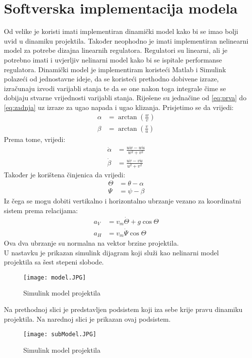 \section{Softverska implementacija modela}
Od velike je koristi imati implementiran dinamički model kako bi se imao bolji 
uvid u dinamiku projektila. Također neophodno je imati implementiran 
nelinearni model za potrebe dizajna linearnih regulatora. Regulatori su linearni, ali 
je potrebno imati i uvjerljiv nelinarni model kako bi se ispitale performanse regulatora.
Dinamički model je implementiram koristeći Matlab i Simulink polazeći od jednostavne ideje,
da se koristeći prethodno dobivene izraze, izračunaju izvodi varijabli stanja te da se one 
nakon toga integrale čime se dobijaju stvarne vrijednosti varijabli stanja. Riješene su jednačine 
od \ref{eq:prva} do \ref{eq:zadnja} uz izraze za ugao napada i ugao klizanja. 
Prisjetimo se da vrijedi:
\begin{align*}
    \alpha &= \arctan(\frac{w}{v})\\
    \beta &= \arctan(\frac{v}{u})
\end{align*}
Prema tome, vrijedi:
\begin{align}
    \dot{\alpha} &= \frac{u\dot{w} - w\dot{u}}{w^2+v^2}\\
    \dot{\beta} &= \frac{u\dot{v} - v\dot{u}}{u^2+v^2}
\end{align}
Također je korištena činjenica da vrijedi:
\begin{align}
    \Theta &= \theta - \alpha\\
     \Psi &= \psi - \beta
\end{align}
Iz čega se mogu dobiti vertikalno i horizontalno ubrzanje vezano za koordinatni sistem prema relacijama:
\begin{align}
    a_V &= v_m\dot{\Theta} + g\cos\Theta \\
    a_H &= v_m\dot{\Psi}\cos\Theta 
\end{align}
Ova dva ubrzanje su normalna na vektor brzine projektila. \\
U nastavku je prikazan simulink dijagram koji služi kao nelinarni model projektila sa 
šest stepeni slobode. 
\begin{figure}[!ht]
    \centering
    \texttt{[image: model.JPG]}
    \caption{Simulink model projektila}
\end{figure}
Na prethodnoj slici je predstavljen podsistem koji iza sebe krije pravu dinamiku projektila. 
Na narednoj slici je prikazan ovaj podsistem. 
\begin{figure}[!ht]
    \centering
    \texttt{[image: subModel.JPG]}
    \caption{Simulink model projektila}
    \label{fig:subimg}
\end{figure}
